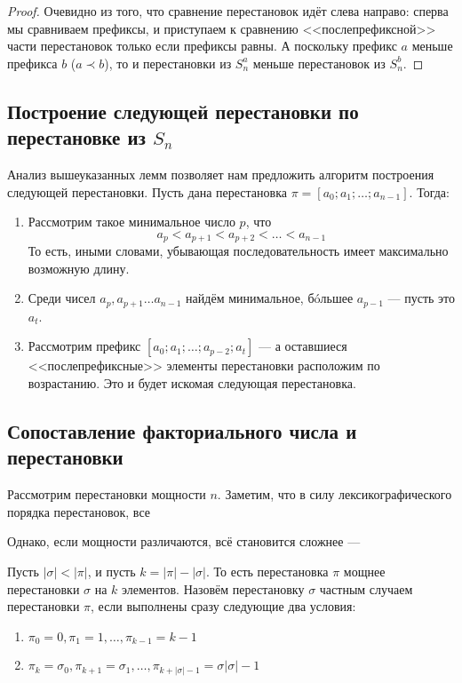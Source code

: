 \documentclass[12pt,a4paper,oneside]{article}
\begin{document}
\begin{proof}
Очевидно из того, что сравнение перестановок идёт слева направо: сперва мы сравниваем
префиксы, и приступаем к сравнению <<послепрефиксной>> части перестановок только
если префиксы равны. А поскольку префикс $a$ меньше префикса $b$ ($a \prec b$), то и 
перестановки из $S^a_n$ меньше перестановок из $S^b_n$.
\end{proof}

\subsection{Построение следующей перестановки по перестановке из $S_n$}

Анализ вышеуказанных лемм позволяет нам предложить алгоритм построения следующей
перестановки. Пусть дана перестановка $\pi = [a_0; a_1; \dots; a_{n-1}]$. Тогда:
\begin{enumerate}
\item Рассмотрим такое минимальное число $p$, что 
$$a_p < a_{p+1} < a_{p+2} < \dots < a_{n-1}$$
То есть, иными словами, убывающая последовательность имеет максимально возможную
длину. 
\item Среди чисел $a_p, a_{p+1} \dots a_{n-1}$ найдём минимальное, б\'{o}льшее $a_{p-1}$ --- 
пусть это $a_t$.
\item Рассмотрим префикс $[a_0; a_1; \dots; a_{p-2}; a_t]$ --- а оставшиеся
<<послепрефиксные>> элементы перестановки расположим по возрастанию. Это и будет 
искомая следующая перестановка.
\end{enumerate}


\subsection{Сопоставление факториального числа и перестановки}

Рассмотрим перестановки мощности $n$. Заметим, что в силу лексикографического порядка 
перестановок, все 


Однако, если мощности различаются, всё становится сложнее ---

\begin{definition}Пусть $|\sigma| < |\pi|$, и пусть $k = |\pi|-|\sigma|$. То есть
перестановка $\pi$ мощнее перестановки $\sigma$ на $k$ элементов. 
Назовём перестановку $\sigma$ частным случаем перестановки $\pi$, если выполнены сразу следующие два условия:
\begin{enumerate}
\item $\pi_0 = 0, \pi_1 = 1, \dots, \pi_{k-1} = k-1$
\item $\pi_k = \sigma_0, \pi_{k+1} = \sigma_1, \dots, \pi_{k+|\sigma|-1} = \sigma{|\sigma|-1}$
\end{enumerate}
\end{definition}
\end{document}
